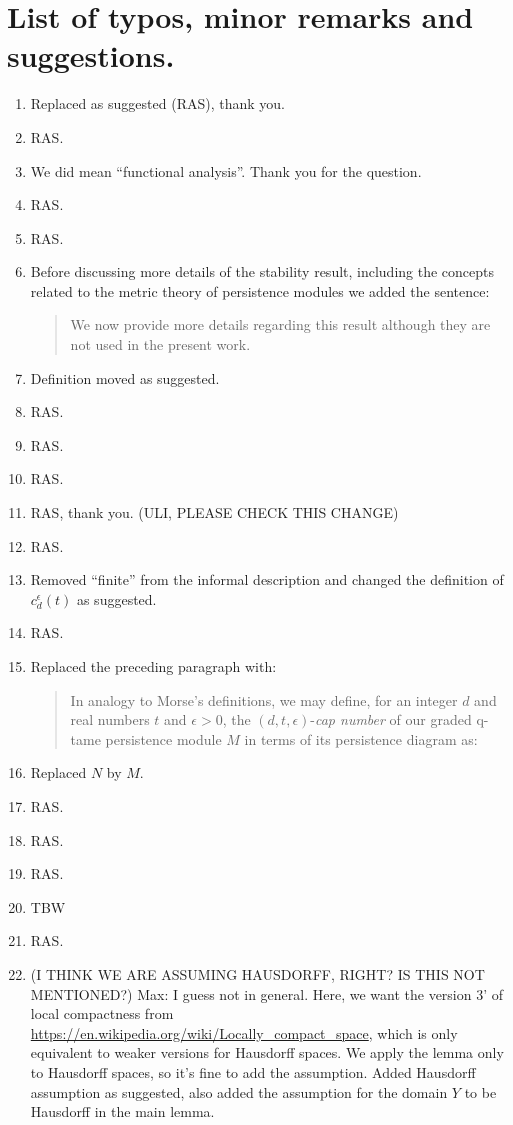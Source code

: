 \documentclass{article}
\begin{document}
	\section{List of typos, minor remarks and suggestions.}
	\begin{enumerate}
		\item Replaced as suggested (RAS), thank you.
		\item RAS.
		\item We did mean ``functional analysis''. Thank you for the question.
		\item RAS.
		\item RAS.
		\item Before discussing more details of the stability result, including the concepts related to the metric theory of persistence modules we added the sentence:
		\begin{quote}
			We now provide more details regarding this result although they are not used in the present work.
		\end{quote}
		\item Definition moved as suggested.
		\item RAS.
		\item RAS.
		\item RAS.
		\item RAS, thank you. (ULI, PLEASE CHECK THIS CHANGE)
		\item RAS.
		\item Removed ``finite'' from the informal description and changed the definition of $c_d^{\epsilon}(t)$ as suggested.
		\item RAS.
		\item Replaced the preceding paragraph with:
		\begin{quote}
			In analogy to Morse's definitions, we may define, for an integer $d$ and real numbers $t$ and $\epsilon > 0$, the $(d, t, \epsilon)$-\emph{cap number} of our graded q-tame persistence module $M$ in terms of its persistence diagram as:
		\end{quote}
		\item Replaced $N$ by $M$.
		\item RAS.
		\item RAS.
		\item RAS.
		\item TBW
		\item RAS.
		\item (I THINK WE ARE ASSUMING HAUSDORFF, RIGHT? IS THIS NOT MENTIONED?)
		Max: I guess not in general. Here, we want the version 3' of local compactness from \url{https://en.wikipedia.org/wiki/Locally_compact_space}, which is only equivalent to weaker versions for Hausdorff spaces. We apply the lemma only to Hausdorff spaces, so it's fine to add the assumption.		
		Added Hausdorff assumption as suggested, also added the assumption for the domain $Y$ to be Hausdorff in the main lemma.


\end{enumerate}
\end{document}

